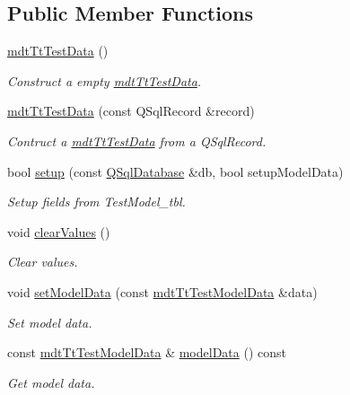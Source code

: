 \subsection*{Public Member Functions}
\begin{DoxyCompactItemize}
\item 
\hyperlink{classmdt_tt_test_data_a851842f98eda70ef3e13162c390619a2}{mdt\-Tt\-Test\-Data} ()
\begin{DoxyCompactList}\small\item\em Construct a empty \hyperlink{classmdt_tt_test_data}{mdt\-Tt\-Test\-Data}. \end{DoxyCompactList}\item 
\hyperlink{classmdt_tt_test_data_a31ee8551d06359bfae3f84d7f9d77b05}{mdt\-Tt\-Test\-Data} (const Q\-Sql\-Record \&record)
\begin{DoxyCompactList}\small\item\em Contruct a \hyperlink{classmdt_tt_test_data}{mdt\-Tt\-Test\-Data} from a Q\-Sql\-Record. \end{DoxyCompactList}\item 
bool \hyperlink{classmdt_tt_test_data_aa702caa1a409448535f4288c19bb53be}{setup} (const \hyperlink{class_q_sql_database}{Q\-Sql\-Database} \&db, bool setup\-Model\-Data)
\begin{DoxyCompactList}\small\item\em Setup fields from Test\-Model\-\_\-tbl. \end{DoxyCompactList}\item 
void \hyperlink{classmdt_tt_test_data_a5e7d9bc9880747e881f0b1f807542481}{clear\-Values} ()
\begin{DoxyCompactList}\small\item\em Clear values. \end{DoxyCompactList}\item 
void \hyperlink{classmdt_tt_test_data_ad0ea2d854bd9fe944daab89926708380}{set\-Model\-Data} (const \hyperlink{classmdt_tt_test_model_data}{mdt\-Tt\-Test\-Model\-Data} \&data)
\begin{DoxyCompactList}\small\item\em Set model data. \end{DoxyCompactList}\item 
const \hyperlink{classmdt_tt_test_model_data}{mdt\-Tt\-Test\-Model\-Data} \& \hyperlink{classmdt_tt_test_data_a071f9f0bf646b44c83c3c9b6d3cc126d}{model\-Data} () const 
\begin{DoxyCompactList}\small\item\em Get model data. \end{DoxyCompactList}\end{DoxyCompactItemize}
